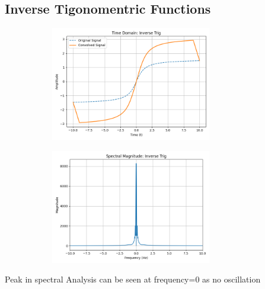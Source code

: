 \documentclass[a4paper,12pt]{article}
\begin{document}
\subsection*{Inverse Tigonomentric Functions}
\begin{figure}[H]
    \centering
    \begin{subfigure}{0.5\textwidth}
        \centering
        \includegraphics[height=5cm]{figs/Analysis8.png}
    \end{subfigure}%
    \begin{subfigure}{0.5\textwidth}
        \centering
        \includegraphics[height=5cm]{figs/Analysis9.png}
    \end{subfigure}
\end{figure}
Peak in spectral Analysis can be seen at frequency=0 as no oscillation
\end{document}
